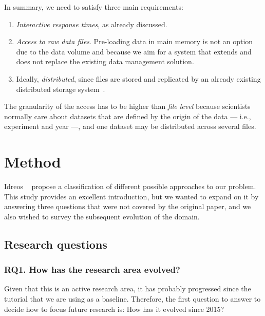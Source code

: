 
In summary, we need to satisfy three main requirements:

\begin{enumerate}
  \item \emph{Interactive response times}, as already discussed.
  \item \emph{Access to raw data files}. Pre-loading data in main memory is not an
    option due to the data volume and because we aim for a system that extends and does
    not replace the existing data management solution.
  \item Ideally, \emph{distributed}, since files are stored and replicated by an already existing
    distributed storage system~\cite{Baud2012}.
\end{enumerate}

The granularity of the access has to be higher than \emph{file level} because
scientists normally care about datasets that are defined by the origin of the data --- i.e., experiment and year ---,
and one dataset may be distributed across several files.

\section{Method}
\label{sec:mapping/method}

Idreos \etal~\cite{Idreos2015} propose a classification of different possible approaches
to our problem.
This study provides an excellent introduction, but we wanted to expand on it by answering
three questions that were not covered by the original paper, and we also wished to survey
the subsequent evolution of the domain.

\subsection{Research questions}
\label{sec:mapping/research_questions}

\subsubsection{RQ1. How has the research area evolved?}
Given that this is an active research area, it has probably progressed since
the tutorial that we are using as a baseline. Therefore, the first
question to answer to decide how to focus future research is:
How has it evolved since 2015?

